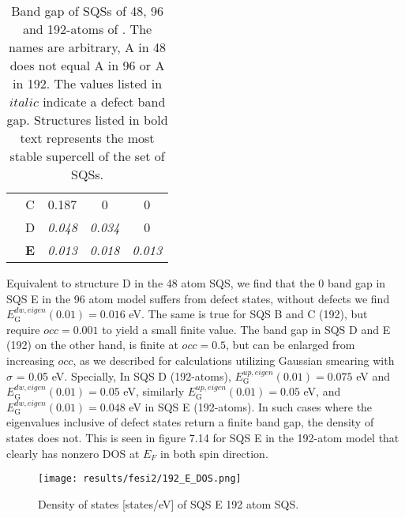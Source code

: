 \begin{table}[H]
\begin{tabular}{@{}ccccc@{}}
\multicolumn{1}{c|}{}                     & C          & 0.187                                                                         & 0                                                                              & 0                                                                               \\
\multicolumn{1}{c|}{}                     & D          & \textit{0.048}                                                                & \textit{0.034}                                                                         & 0                                                                              \\
\multicolumn{1}{c|}{}                     & \textbf{E} & \textit{0.013}                                                                & \textit{0.018}                                                                         & \textit{0.013}                                                                          \\ \bottomrule 
\end{tabular}
\caption{Band gap of SQSs of 48, 96 and 192-atoms of . The names are arbitrary, A in 48 does not equal A in 96 or A in 192. The values listed in $italic$ indicate a defect band gap. Structures listed in bold text represents the most stable supercell of the set of SQSs.}
\end{table}

Equivalent to structure D in the 48 atom SQS, we find that the 0 band gap in SQS E in the 96 atom model suffers from defect states, without defects we find $E_\text{G} ^{dw, eigen}(0.01) = 0.016$ eV. The same is true for SQS B and C (192), but require $occ = 0.001$ to yield a small finite value. The band gap in SQS D and E (192) on the other hand, is finite at $occ = 0.5$, but can be enlarged from increasing $occ$, as we described for calculations utilizing Gaussian smearing with $\sigma$ = 0.05 eV. Specially, In SQS D (192-atoms), $E_\text{G} ^{up, eigen}(0.01) = 0.075$ eV and $E_\text{G} ^{dw, eigen}(0.01) = 0.05$ eV, similarly $E_\text{G} ^{up, eigen}(0.01) = 0.05$ eV, and $E_\text{G} ^{dw, eigen}(0.01) = 0.048$ eV in SQS E (192-atoms). In such cases where the eigenvalues inclusive of defect states return a finite band gap, the density of states does not. This is seen in figure 7.14 for SQS E in the 192-atom model that clearly has nonzero DOS at $E_F$ in both spin direction. 

\begin{figure}[H]
\centering
\texttt{[image: results/fesi2/192\_E\_DOS.png]}
\caption{Density of states [states/eV] of SQS E 192 atom SQS.}
\end{figure}    
 
